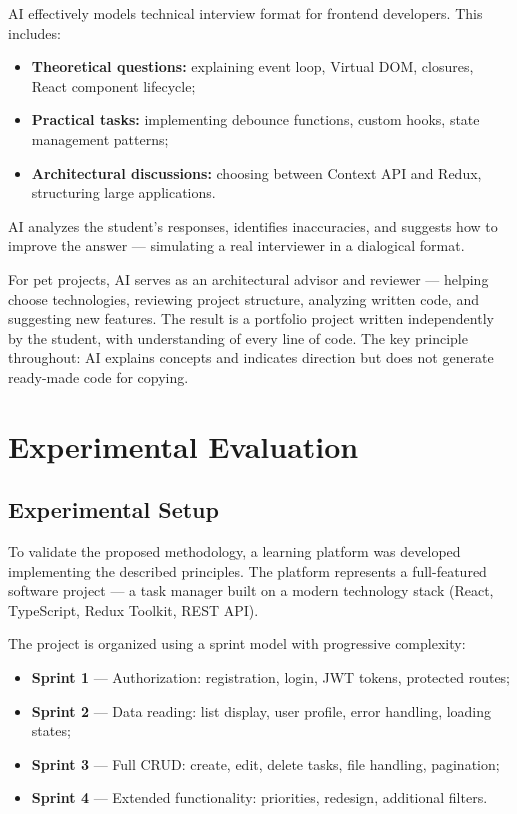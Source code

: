 \documentclass[conference,a4paper]{IEEEtran}
\begin{document}
AI effectively models technical interview format for frontend developers. This includes:
\begin{itemize}
\item \textbf{Theoretical questions:} explaining event loop, Virtual DOM, closures, React component lifecycle;
\item \textbf{Practical tasks:} implementing debounce functions, custom hooks, state management patterns;
\item \textbf{Architectural discussions:} choosing between Context API and Redux, structuring large applications.
\end{itemize}

AI analyzes the student's responses, identifies inaccuracies, and suggests how to improve the answer --- simulating a real interviewer in a dialogical format.

For pet projects, AI serves as an architectural advisor and reviewer --- helping choose technologies, reviewing project structure, analyzing written code, and suggesting new features. The result is a portfolio project written independently by the student, with understanding of every line of code. The key principle throughout: AI explains concepts and indicates direction but does not generate ready-made code for copying.

\section{Experimental Evaluation}

\subsection{Experimental Setup}

To validate the proposed methodology, a learning platform was developed implementing the described principles. The platform represents a full-featured software project --- a task manager built on a modern technology stack (React, TypeScript, Redux Toolkit, REST API).

The project is organized using a sprint model with progressive complexity:
\begin{itemize}
\item \textbf{Sprint 1} --- Authorization: registration, login, JWT tokens, protected routes;
\item \textbf{Sprint 2} --- Data reading: list display, user profile, error handling, loading states;
\item \textbf{Sprint 3} --- Full CRUD: create, edit, delete tasks, file handling, pagination;
\item \textbf{Sprint 4} --- Extended functionality: priorities, redesign, additional filters.
\end{itemize}
\end{document}
